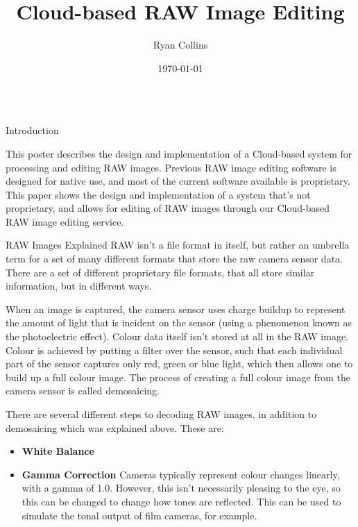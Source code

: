 \documentclass[final]{beamer}
\title[Final Year Project Poster]{Cloud-based RAW Image Editing}
\author[R Collins]{Ryan Collins}
\institute[Durham]{Department of Computer Science, Durham University}
\date{\today}
\begin{document}
  \begin{frame}{} 

  \vfill
    \begin{columns}[t]
      \begin{column}{.48\linewidth}
        \begin{block}{Introduction}

          This poster describes the design and implementation of
          a Cloud-based system for processing and editing RAW images.
          Previous RAW image editing software is designed for native
          use, and most of the current software available is proprietary.
          This paper shows the design and implementation of a system
          that's not proprietary, and allows for editing of RAW images
          through our Cloud-based RAW image editing service.

        \end{block}

        \begin{block}{RAW Images Explained}
          RAW isn't a file format in itself, but rather an umbrella term for a set of many different formats that store the
          raw camera sensor data. There are a set of different proprietary file formats, that all store similar information,
          but in different ways.
          
          When an image is captured, the camera sensor uses charge buildup to represent the amount of light that is incident on the sensor
          (using a phenomenon known as the photoelectric effect). Colour data itself isn't stored at all in the RAW image. Colour is achieved
          by putting a filter over the sensor, such that each individual part of the sensor captures only red, green or blue light, which then
          allows one to build up a full colour image. The process of creating a full colour image from the camera sensor is called demosaicing.
          
          
          There are several different steps to decoding RAW images, in addition to demosaicing which was explained above. These are:
          \begin{itemize}

          \item \textbf{White Balance}
          
          
          \item \textbf{Gamma Correction}
          Cameras typically represent colour changes linearly, with a gamma of 1.0.
          However, this isn't necessarily pleasing to the eye, so this can be changed to change how tones are reflected. This can be used to simulate
          the tonal output of film cameras, for example.
          

\end{itemize}
\end{block}
\end{column}
\end{columns}
\end{frame}
\end{document}
